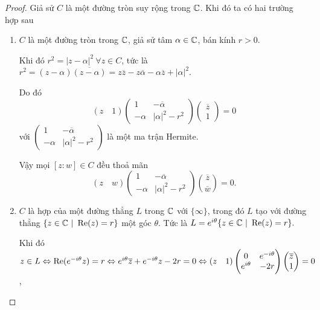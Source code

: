 \begin{proof}
    Giả sử $C$ là một đường tròn suy rộng trong $\mathbb{C}$. Khi đó ta có hai trường hợp sau
    \begin{enumerate}
        \item $C$ là một đường tròn trong $\mathbb{C}$, giả sử tâm $\alpha \in \mathbb{C}$, bán kính $r>0$.

        Khi đó 
        $r^2 = |z-\alpha|^2 ~\forall z \in C$, tức là
        $r^2 = (z-\alpha)\overline{(z-\alpha)} = z\overline{z}-z\overline{\alpha} - \alpha \overline{z} + |\alpha|^2$.

        Do đó
        \[(z\quad 1)\begin{pmatrix}
            1 & -\overline{\alpha}\\
            -\alpha & |\alpha|^2-r^2
        \end{pmatrix}
        \begin{pmatrix}
            \overline{z}\\ 1
        \end{pmatrix} = 0\]
        với $\begin{pmatrix}
            1 & -\overline{\alpha}\\
            -\alpha & |\alpha|^2-r^2
        \end{pmatrix}$ là một ma trận Hermite.
        
        Vậy mọi $[z:w] \in C$ đều thoả mãn \[(z\quad w)\begin{pmatrix}
            1 & -\overline{\alpha}\\
            -\alpha & |\alpha|^2-r^2
        \end{pmatrix}\binom{\overline{z}}{\overline{w}} = 0.\]
        \item $C$ là hợp của một đường thẳng $L$ trong $\mathbb{C}$ với $\{\infty\}$, trong đó $L$ tạo với đường thẳng $\{z\in \mathbb{C}~|~\operatorname{Re}(z) = r\}$ một góc $\theta$. Tức là $L = e^{i\theta}\{z\in \mathbb{C}~|~\operatorname{Re}(z) = r\}.$

        Khi đó $z\in L \Leftrightarrow \operatorname{Re}(e^{-i\theta}z) = r \Leftrightarrow e^{i\theta}\overline{z} + e^{-i\theta}z - 2r = 0 \Leftrightarrow (z \quad 1)\begin{pmatrix}
            0 & e^{-i\theta}\\
            e^{i\theta} & -2r
        \end{pmatrix}\begin{pmatrix}
            \overline{z} \\ 1
        \end{pmatrix} = 0$,
        

\end{enumerate}
\end{proof}
